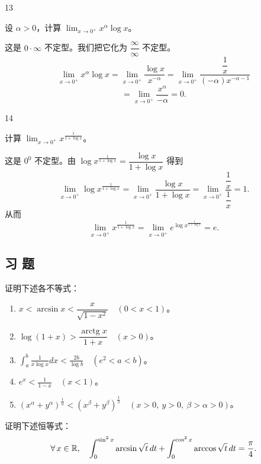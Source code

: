 \begin{sourceexample}{13}

	设 \(\alpha>0\)，计算 \(\displaystyle\lim_{x\to0^+}x^\alpha\log x\)。

	这是 \(0\cdot\infty\) 不定型。我们把它化为 \(\dfrac\infty\infty\) 不定型。
	\[
	\lim_{x\to0^+}x^\alpha\log x=\lim_{x\to0^+}\frac{\log x}{x^{-\alpha}}=\lim_{x\to0^+}\frac{\dfrac1x}{(-\alpha)x^{-\alpha-1}}
	\]
	\[
	=\lim_{x\to0^+}\frac{x^\alpha}{-\alpha}=0.
	\]

\end{sourceexample}

\begin{sourceexample}{14}

	计算 \(\displaystyle\lim_{x\to0^+}x^{\frac1{1+\log x}}\)。

	这是 \(0^0\) 不定型。由 \(\log x^{\frac1{1+\log x}}=\dfrac{\log x}{1+\log x}\) 得到
	\[
	\lim_{x\to0^+}\log x^{\frac1{1+\log x}}=\lim_{x\to0^+}\frac{\log x}{1+\log x}=\lim_{x\to0^+}\frac{\dfrac1x}{\dfrac1x}=1.
	\]
	从而
	\[
	\lim_{x\to0^+}x^{\frac1{1+\log x}}=\lim_{x\to0^+}e^{\log x^{\frac1{1+\log x}}}=e.
	\]

\end{sourceexample}

\subsection*{习 题}

\begin{exercise}
	\item 证明下述各不等式：
	\begin{enumerate}[label=\arabic*)]
		\item \(x<\arcsin x<\dfrac{x}{\sqrt{1-x^2}}\quad(0<x<1)\)。
		\item \(\log(1+x)>\dfrac{\operatorname{arctg}x}{1+x}\quad(x>0)\)。
		\item \(\displaystyle\int_a^b\frac1{x\log x}dx<\frac{2b}{\log b}\quad(e^2<a<b)\)。
		\item \(\displaystyle e^x<\frac1{1-x}\quad(x<1)\)。
		\item \((x^\alpha+y^\alpha)^{\frac1\alpha}<(x^\beta+y^\beta)^{\frac1\beta}\quad(x>0,\ y>0,\ \beta>\alpha>0)\)。
	\end{enumerate}
\end{exercise}

\begin{exercise}
	\item 证明下述恒等式：
	\[
	\forall\,x\in\mathbb{R},\quad\int_0^{\sin^2x}\arcsin\sqrt t\,dt+\int_0^{\cos^2x}\arccos\sqrt t\,dt=\frac\pi4.
	\]
\end{exercise}

